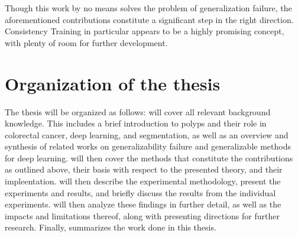     Though this work by no means solves the problem of generalization failure, the aforementioned contributions constitute a significant step in the right direction. Consistency Training in particular appears to be a highly promising concept, with plenty of room for further development. 
    
    \section{Organization of the thesis}
    The thesis will be organized as follows:  will cover all relevant background knowledge. This includes a brief introduction to polyps and their role in colorectal cancer, deep learning, and segmentation, as well as an overview and synthesis of related works on generalizability failure and generalizable methods for deep learning.  will then cover the methods that constitute the contributions as outlined above, their basis with respect to the presented theory, and their impleentation.  will then describe the experimental methodology, present the experiments and results, and briefly discuss the results from the individual experiments.  will then analyze these findings in further detail, as well as the impacts and limitations thereof, along with presenting directions for further research. Finally,  summarizes the work done in this thesis.